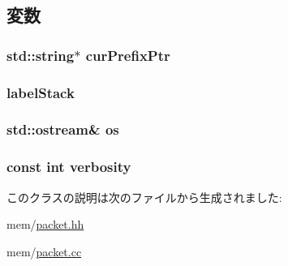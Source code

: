 \subsection{変数}
\hypertarget{classPacket_1_1PrintReqState_a3a19280cb30a487c3097469433fb9aba}{
\subsubsection[{curPrefixPtr}]{\setlength{\rightskip}{0pt plus 5cm}std::string$\ast$ {\bf curPrefixPtr}}}
\label{classPacket_1_1PrintReqState_a3a19280cb30a487c3097469433fb9aba}
\hypertarget{classPacket_1_1PrintReqState_a4e8dbaefec458a8dd7b66a5e8c20db04}{
\subsubsection[{labelStack}]{ {\bf labelStack}}}
\label{classPacket_1_1PrintReqState_a4e8dbaefec458a8dd7b66a5e8c20db04}
\hypertarget{classPacket_1_1PrintReqState_a1a917786b846a8a836dd09f6970db62a}{
\subsubsection[{os}]{\setlength{\rightskip}{0pt plus 5cm}std::ostream\& {\bf os}}}
\label{classPacket_1_1PrintReqState_a1a917786b846a8a836dd09f6970db62a}
\hypertarget{classPacket_1_1PrintReqState_ae2bc69d2191ab7552502f23bee9f8295}{
\subsubsection[{verbosity}]{\setlength{\rightskip}{0pt plus 5cm}const int {\bf verbosity}}}
\label{classPacket_1_1PrintReqState_ae2bc69d2191ab7552502f23bee9f8295}


このクラスの説明は次のファイルから生成されました:\begin{DoxyCompactItemize}
\item 
mem/\hyperlink{packet_8hh}{packet.hh}\item 
mem/\hyperlink{packet_8cc}{packet.cc}\end{DoxyCompactItemize}
